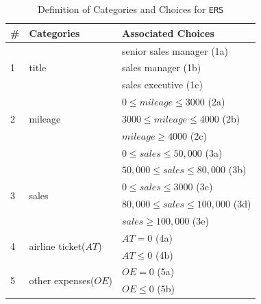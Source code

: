 \documentclass[10pt,journal,compsoc]{IEEEtran}
\begin{document}
\begin{table}[htb]
  \caption{Definition of Categories and Choices for \texttt{ERS}}
  \label{table:categoriesofers}
  \centering
  \begin{tabular}{lll} \toprule
  \#                &Categories                                                &Associated Choices      \\ \midrule
                    &                                                          &senior sales manager (1a)        \\
  1                 &\multicolumn{1}{l}{title}                                 &sales manager (1b)              \\
                    &\multicolumn{1}{l}{}                                      &sales executive (1c)           \\ \midrule
                    &\multicolumn{1}{l}{\multirow{3}{*}{mileage}}              &$0 \leq mileage \leq 3000$ (2a)     \\
  2                 &\multicolumn{1}{l}{}                                      &$3000 \le mileage \leq 4000$ (2b)     \\
                    &\multicolumn{1}{l}{}                                      &$mileage \ge 4000$ (2c)              \\ \midrule
                    &                                                          &$0 \leq sales \le 50,000$ (3a)      \\
                    &\multicolumn{1}{l}{}                                      &$50,000 \leq sales \le 80,000$ (3b)      \\
  \multirow{2}{*}{3}&\multicolumn{1}{l}{\multirow{2}{*}{sales}}                &$0 \leq sales \leq 3000$ (3c)     \\
                    &\multicolumn{1}{l}{}                                      &$80,000 \leq sales \le 100,000$ (3d)      \\
                    &\multicolumn{1}{l}{}                                      &$sales \geq 100,000$ (3e)             \\ \midrule
  \multirow{2}{*}{4}&\multicolumn{1}{l}{\multirow{2}{*}{airline ticket($AT$)}} &$AT = 0$ (4a)     \\
                    &\multicolumn{1}{l}{}                                      &$AT \le 0$ (4b)  \\ \midrule
  \multirow{2}{*}{5}&\multicolumn{1}{l}{\multirow{2}{*}{other expenses($OE$)}} &$OE = 0$ (5a)            \\
                    &\multicolumn{1}{l}{}                                      &$OE \le 0$ (5b)            \\ \bottomrule
  \end{tabular}
\end{table}
\end{document}
